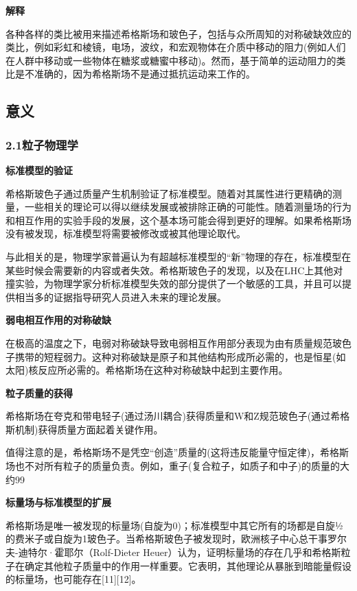 \textbf{解释}

各种各样的类比被用来描述希格斯场和玻色子，包括与众所周知的对称破缺效应的类比，例如彩虹和棱镜，电场，波纹，和宏观物体在介质中移动的阻力(例如人们在人群中移动或一些物体在糖浆或糖蜜中移动)。然而，基于简单的运动阻力的类比是不准确的，因为希格斯场不是通过抵抗运动来工作的。

\subsection{意义}

\subsubsection{2.1粒子物理学}

\textbf{标准模型的验证}

希格斯玻色子通过质量产生机制验证了标准模型。随着对其属性进行更精确的测量，一些相关的理论可以得以继续发展或被排除正确的可能性。随着测量场的行为和相互作用的实验手段的发展，这个基本场可能会得到更好的理解。如果希格斯场没有被发现，标准模型将需要被修改或被其他理论取代。

与此相关的是，物理学家普遍认为有超越标准模型的“新”物理的存在，标准模型在某些时候会需要新的内容或者失效。希格斯玻色子的发现，以及在LHC上其他对撞实验，为物理学家分析标准模型失效的部分提供了一个敏感的工具，并且可以提供相当多的证据指导研究人员进入未来的理论发展。

\textbf{弱电相互作用的对称破缺}

在极高的温度之下，电弱对称破缺导致电弱相互作用部分表现为由有质量规范玻色子携带的短程弱力。这种对称破缺是原子和其他结构形成所必需的，也是恒星(如太阳)核反应所必需的。希格斯场在这种对称破缺中起到主要作用。

\textbf{粒子质量的获得}

希格斯场在夸克和带电轻子(通过汤川耦合)获得质量和W和Z规范玻色子(通过希格斯机制)获得质量方面起着关键作用。

值得注意的是，希格斯场不是凭空“创造”质量的(这将违反能量守恒定律)，希格斯场也不对所有粒子的质量负责。例如，重子(复合粒子，如质子和中子)的质量的大约99%

\textbf{标量场与标准模型的扩展}

希格斯场是唯一被发现的标量场(自旋为0)；标准模型中其它所有的场都是自旋½的费米子或自旋为1玻色子。当希格斯玻色子被发现时，欧洲核子中心总干事罗尔夫-迪特尔·霍耶尔（Rolf-Dieter Heuer）认为，证明标量场的存在几乎和希格斯粒子在确定其他粒子质量中的作用一样重要。它表明，其他理论从暴胀到暗能量假设的标量场，也可能存在[11][12]。

